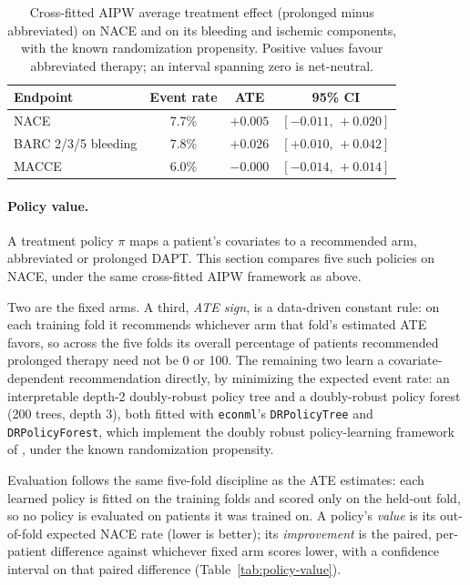 \begin{table}[H]
\centering
\caption{Cross-fitted AIPW average treatment effect (prolonged minus
abbreviated) on NACE and on its bleeding and ischemic components, with the
known randomization propensity. Positive values favour abbreviated therapy;
an interval spanning zero is net-neutral.}
\label{tab:nace-ate}
\begin{tabular}{lccc}
\toprule
Endpoint & Event rate & ATE & 95\% CI \\
\midrule
NACE                 & 7.7\% & $+0.005$ & $[-0.011,\,+0.020]$ \\
BARC 2/3/5 bleeding   & 7.8\% & $+0.026$ & $[+0.010,\,+0.042]$ \\
MACCE                 & 6.0\% & $-0.000$ & $[-0.014,\,+0.014]$ \\
\bottomrule
\end{tabular}
\end{table}

\paragraph{Policy value.}
A treatment policy $\pi$ maps a patient's covariates to a recommended arm, 
abbreviated or prolonged DAPT. This section compares five such policies on NACE, 
under the same cross-fitted AIPW framework as above.

Two are the fixed arms. A third, \emph{ATE sign}, is a data-driven constant rule:
on each training fold it recommends whichever arm that fold's estimated ATE favors,
so across the five folds its overall percentage of patients recommended prolonged 
therapy need not be 0 or 100. The remaining two learn a covariate-dependent recommendation 
directly, by minimizing the expected event rate: an interpretable depth-2 doubly-robust 
policy tree and a doubly-robust policy forest (200 trees, depth 3), both fitted with \texttt{econml}'s
\texttt{DRPolicyTree} and \texttt{DRPolicyForest}, which implement the doubly robust policy-learning
framework of \citet{athey2021policylearning}, under the known randomization propensity.

Evaluation follows the same five-fold discipline as the ATE estimates: each learned policy is fitted 
on the training folds and scored only on the held-out fold, so no policy is evaluated on patients it 
was trained on. A policy's \emph{value} is its out-of-fold expected NACE rate (lower is better); 
its \emph{improvement} is the paired, per-patient difference against whichever fixed arm scores lower, 
with a confidence interval on that paired difference (Table~\ref{tab:policy-value}).

